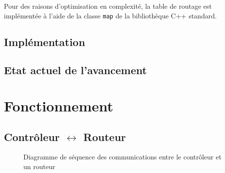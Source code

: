 \documentclass[a4paper,11pt]{article}
\begin{document}
Pour des raisons d'optimisation en complexité, la table de routage est implémentée à l'aide de la classe \texttt{map} de la bibliothèque C++ standard.

\subsection{Implémentation}

\subsection{Etat actuel de l'avancement}

\section{Fonctionnement}

\subsection{Contrôleur $\leftrightarrow$ Routeur}

\begin{figure}[H]
\begin{center}
\caption{Diagramme de séquence des communications entre le contrôleur et un routeur}
\end{center}
\end{figure}
\end{document}
